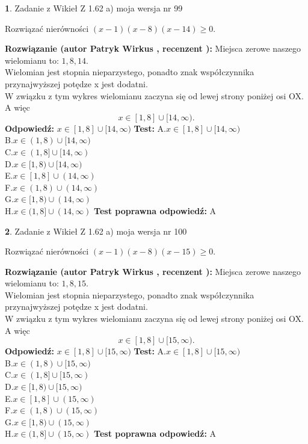 \documentclass[12pt, a4paper]{article}
\theoremstyle{definition} %
\newtheorem{zad}{}
\newcommand{\zadStart}[1]{\begin{zad}#1\newline}
\newcommand{\zadStop}{\end{zad}}
\newcommand{\rozwStart}[2]{\noindent \textbf{Rozwiązanie (autor #1 , recenzent #2): }\newline}
\newcommand{\rozwStop}{\newline}
\newcommand{\odpStart}{\noindent \textbf{Odpowiedź:}\newline}
\newcommand{\odpStop}{\newline}
\newcommand{\testStart}{\noindent \textbf{Test:}\newline}
\newcommand{\testStop}{\newline}
\newcommand{\kluczStart}{\noindent \textbf{Test poprawna odpowiedź:}\newline}
\newcommand{\kluczStop}{\newline}
\begin{document}
\zadStart{Zadanie z Wikieł Z 1.62 a) moja wersja nr 99}

Rozwiązać nierówności $(x-1)(x-8)(x-14)\ge0$.
\zadStop
\rozwStart{Patryk Wirkus}{}
Miejsca zerowe naszego wielomianu to: $1, 8, 14$.\\
Wielomian jest stopnia nieparzystego, ponadto znak współczynnika przy\linebreak najwyższej potędze x jest dodatni.\\ W związku z tym wykres wielomianu zaczyna się od lewej strony poniżej osi OX. A więc $$x \in [1,8] \cup [14,\infty).$$
\rozwStop
\odpStart
$x \in [1,8] \cup [14,\infty)$
\odpStop
\testStart
A.$x \in [1,8] \cup [14,\infty)$\\
B.$x \in (1,8) \cup [14,\infty)$\\
C.$x \in (1,8] \cup [14,\infty)$\\
D.$x \in [1,8) \cup [14,\infty)$\\
E.$x \in [1,8] \cup (14,\infty)$\\
F.$x \in (1,8) \cup (14,\infty)$\\
G.$x \in [1,8) \cup (14,\infty)$\\
H.$x \in (1,8] \cup (14,\infty)$
\testStop
\kluczStart
A
\kluczStop



\zadStart{Zadanie z Wikieł Z 1.62 a) moja wersja nr 100}

Rozwiązać nierówności $(x-1)(x-8)(x-15)\ge0$.
\zadStop
\rozwStart{Patryk Wirkus}{}
Miejsca zerowe naszego wielomianu to: $1, 8, 15$.\\
Wielomian jest stopnia nieparzystego, ponadto znak współczynnika przy\linebreak najwyższej potędze x jest dodatni.\\ W związku z tym wykres wielomianu zaczyna się od lewej strony poniżej osi OX. A więc $$x \in [1,8] \cup [15,\infty).$$
\rozwStop
\odpStart
$x \in [1,8] \cup [15,\infty)$
\odpStop
\testStart
A.$x \in [1,8] \cup [15,\infty)$\\
B.$x \in (1,8) \cup [15,\infty)$\\
C.$x \in (1,8] \cup [15,\infty)$\\
D.$x \in [1,8) \cup [15,\infty)$\\
E.$x \in [1,8] \cup (15,\infty)$\\
F.$x \in (1,8) \cup (15,\infty)$\\
G.$x \in [1,8) \cup (15,\infty)$\\
H.$x \in (1,8] \cup (15,\infty)$
\testStop
\kluczStart
A
\kluczStop
\end{document}
